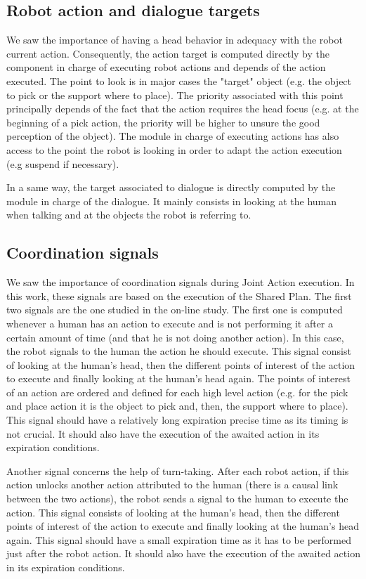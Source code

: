\documentclass[english,a4paper,11pt,twoside]{StyleThese}
\begin{document}
\subsection{Robot action and dialogue targets}

We saw the importance of having a head behavior in adequacy with the robot current action. Consequently, the action target is computed directly by the component in charge of executing robot actions and depends of the action executed. The point to look is in major cases the "target" object (e.g. the object to pick or the support where to place). The priority associated with this point principally depends of the fact that the action requires the head focus (e.g. at the beginning of a pick action, the priority will be higher to unsure the good perception of the object). The module in charge of executing actions has also access to the point the robot is looking in order to adapt the action execution (e.g suspend if necessary).

In a same way, the target associated to dialogue is directly computed by the module in charge of the dialogue. It mainly consists in looking at the human when talking and at the objects the robot is referring to.

\subsection{Coordination signals}

We saw the importance of coordination signals during Joint Action execution. In this work, these signals are based on the execution of the Shared Plan. The first two signals are the one studied in the on-line study. The first one is computed whenever a human has an action to execute and is not performing it after a certain amount of time (and that he is not doing another action). In this case, the robot signals to the human the action he should execute. This signal consist of looking at the human's head, then the different points of interest of the action to execute and finally looking at the human's head again. The points of interest of an action are ordered and defined for each high level action (e.g. for the pick and place action it is the object to pick and, then, the support where to place). This signal should have a relatively long expiration precise time as its timing is not crucial. It should also have the execution of the awaited action in its expiration conditions.

Another signal concerns the help of turn-taking. After each robot action, if this action unlocks another action attributed to the human (there is a causal link between the two actions), the robot sends a signal to the human to execute the action. This signal consists of looking at the human's head, then the different points of interest of the action to execute and finally looking at the human's head again. This signal should have a small expiration time as it has to be performed just after the robot action. It should also have the execution of the awaited action in its expiration conditions.
\end{document}
